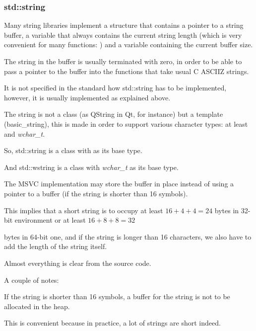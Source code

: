 \subsubsection{std::string}
\label{std_string}


Many string libraries  implement a structure that contains a pointer to a string buffer,
a variable that always contains the current string length 
(which is very convenient for many functions: ) and
a variable containing the current buffer size.

The string in the buffer is usually terminated with zero, in order to be able to pass a pointer to the buffer
into the functions that take  usual C \ac{ASCIIZ} strings.

It is not specified in the \Cpp standard how std::string has to be implemented,
however, it is usually implemented as explained above.

The \Cpp string is not a class (as QString in Qt, for instance) but a template (basic\_string),
this is made in order to support various character types: at least \Tchar and \emph{wchar\_t}.

So, std::string is a class with \Tchar as its base type.

And std::wstring is a class with \emph{wchar\_t} as its base type.


The MSVC implementation may store the buffer in place instead of using a pointer to a buffer 
(if the string is shorter than 16 symbols).

This implies that a short string is to occupy at least $16 + 4 + 4 = 24$ 
bytes in 32-bit environment or at least $16 + 8 + 8 = 32$ 

bytes in 64-bit one, and if the string is longer than 16 characters, we also have to add the length of the string itself.



Almost everything is clear from the source code.

A couple of notes:

If the string is shorter than 16 symbols, 
a buffer for the string is not to be allocated in the \gls{heap}.

This is convenient because
in practice, a lot of strings are short indeed.

